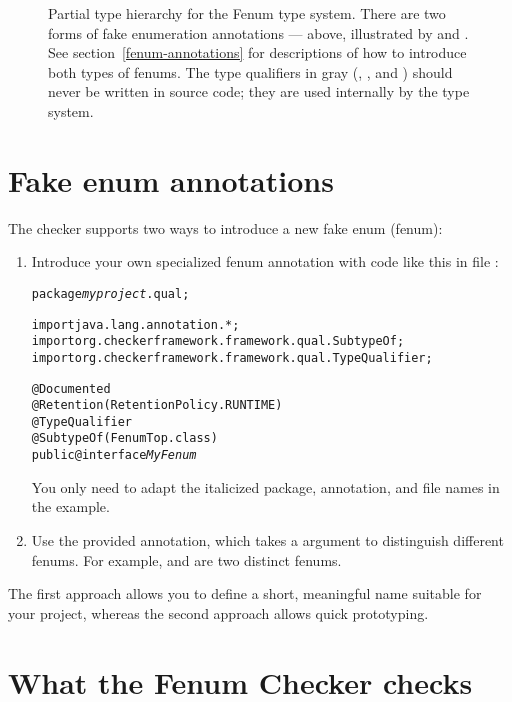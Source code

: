 \begin{figure}
\caption{Partial type hierarchy for the Fenum type system.
There are two forms of fake enumeration annotations --- above, illustrated
by  and .
See section~\ref{fenum-annotations} for descriptions of how to
introduce both types of fenums. The type qualifiers in gray
(, , and )
should never be written in
source code; they are used internally by the type system.}
\label{fig-fenum-hierarchy}
\end{figure}

\section{Fake enum annotations\label{fenum-annotations}}

The checker supports two ways to introduce a new fake enum (fenum):

\begin{enumerate}
\item Introduce your own specialized fenum annotation with code like this in
file :

\begin{alltt}
package \textit{myproject}.qual;

import java.lang.annotation.*;
import org.checkerframework.framework.qual.SubtypeOf;
import org.checkerframework.framework.qual.TypeQualifier;

@Documented
@Retention(RetentionPolicy.RUNTIME)
@TypeQualifier
@SubtypeOf( \ttlcb{} FenumTop.class \ttrcb{} )
public @interface \textit{MyFenum} \ttlcb\ttrcb
\end{alltt}

You only need to adapt the italicized package, annotation, and file names in the example.


\item Use the provided  annotation, which takes a
 argument to distinguish different fenums.
For example,  and  are two distinct fenums.
\end{enumerate}


The first approach allows you to define a short, meaningful name suitable for
your project, whereas the second approach allows quick prototyping.



\section{What the Fenum Checker checks\label{fenum-checks}}

